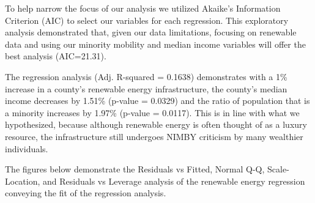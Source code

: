 \documentclass[
  12pt,
]{article}
\begin{document}
To help narrow the focus of our analysis we utilized Akaike's
Information Criterion (AIC) to select our variables for each regression.
This exploratory analysis demonstrated that, given our data limitations,
focusing on renewable data and using our minority mobility and median
income variables will offer the best analysis (AIC=21.31).

The regression analysis (Adj. R-squared = 0.1638) demonstrates with a
1\% increase in a county's renewable energy infrastructure, the county's
median income decreases by 1.51\% (p-value = 0.0329) and the ratio of
population that is a minority increases by 1.97\% (p-value = 0.0117).
This is in line with what we hypothesized, because although renewable
energy is often thought of as a luxury resource, the infrastructure
still undergoes NIMBY criticism by many wealthier individuals.

The figures below demonstrate the Residuals vs Fitted, Normal Q-Q,
Scale-Location, and Residuals vs Leverage analysis of the renewable
energy regression conveying the fit of the regression analysis.
\end{document}
